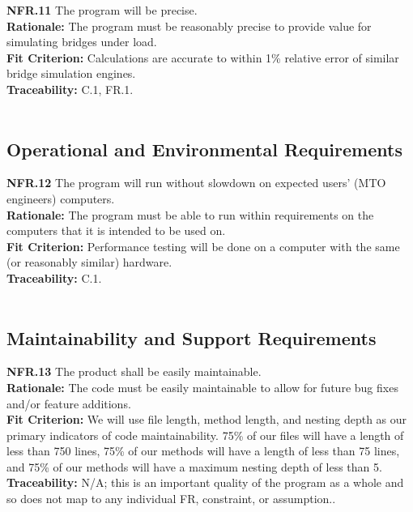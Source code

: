 \documentclass[12pt]{article}
\begin{document}
  \noindent\textbf{NFR.11} The program will be precise.\\
  \textbf{Rationale:} The program must be reasonably precise to provide value for simulating bridges under load.\\
  \textbf{Fit Criterion:} Calculations are accurate to within 1\% relative error of similar bridge simulation engines.\\
  \textbf{Traceability:} C.1, FR.1.\\\\

\subsection{Operational and Environmental Requirements}

  \textbf{NFR.12} The program will run without slowdown on expected users' (MTO engineers) computers.\\
  \textbf{Rationale:} The program must be able to run within requirements on the computers that it is intended to be used on.\\
  \textbf{Fit Criterion:} Performance testing will be done on a computer with the same (or reasonably similar) hardware.\\
  \textbf{Traceability:} C.1.\\\\

\subsection{Maintainability and Support Requirements}

  \textbf{NFR.13} The product shall be easily maintainable.\\
  \textbf{Rationale:} The code must be easily maintainable to allow for future bug fixes and/or feature additions.\\
  \textbf{Fit Criterion:} We will use file length, method length, and nesting depth as our primary indicators of code maintainability.
  75\% of our files will have a length of less than 750 lines, 75\% of our methods will have a length of less than 75 lines, and 75\% of our methods will have a maximum nesting depth of less than 5.\\
  \textbf{Traceability:} N/A; this is an important quality of the program as a whole and so does not map to any individual FR, constraint, or assumption..\\\\
\end{document}
